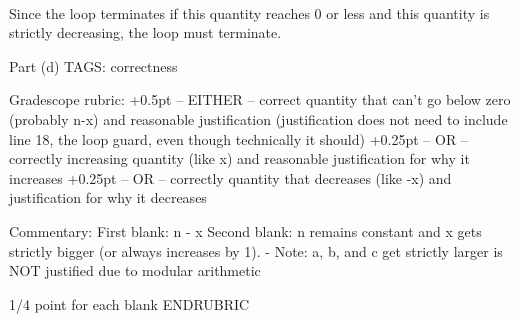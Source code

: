 \begin{parts}
\begin{framed}
\medskip
{}\else~\vspace{8ex}\fi

\smallskip
Since the loop terminates if this quantity
reaches 0 or less and this quantity is strictly decreasing, the loop must terminate.
\end{framed}

\RUBRIC
Part (d)
TAGS: correctness

Gradescope rubric:
+0.5pt  -- EITHER -- correct quantity that can't go below zero (probably n-x) and reasonable justification (justification does not need to include line 18, the loop guard, even though technically it should)
+0.25pt  -- OR -- correctly increasing quantity (like x) and reasonable justification for why it increases
+0.25pt  -- OR -- correctly quantity that decreases (like -x) and justification for why it decreases

Commentary:
First blank:  n - x
Second blank: n remains constant and x gets strictly bigger (or always increases by 1).
- Note: a, b, and c get strictly larger is NOT justified due to modular arithmetic

1/4 point for each blank
ENDRUBRIC

\end{parts}
